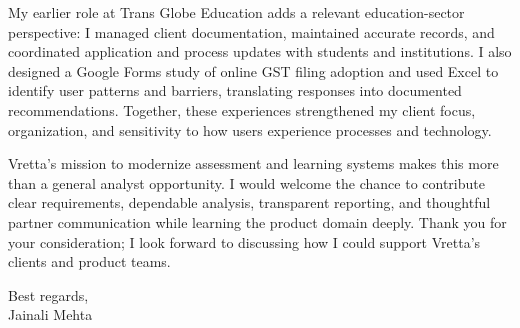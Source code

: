 \documentclass[letterpaper,11pt]{article}
\begin{document}
\bigbreak
My earlier role at Trans Globe Education adds a relevant education-sector perspective: I managed client documentation, maintained accurate records, and coordinated application and process updates with students and institutions. I also designed a Google Forms study of online GST filing adoption and used Excel to identify user patterns and barriers, translating responses into documented recommendations. Together, these experiences strengthened my client focus, organization, and sensitivity to how users experience processes and technology.

\bigbreak
Vretta's mission to modernize assessment and learning systems makes this more than a general analyst opportunity. I would welcome the chance to contribute clear requirements, dependable analysis, transparent reporting, and thoughtful partner communication while learning the product domain deeply. Thank you for your consideration; I look forward to discussing how I could support Vretta's clients and product teams.

\bigbreak
Best regards,\\
Jainali Mehta
\end{document}
